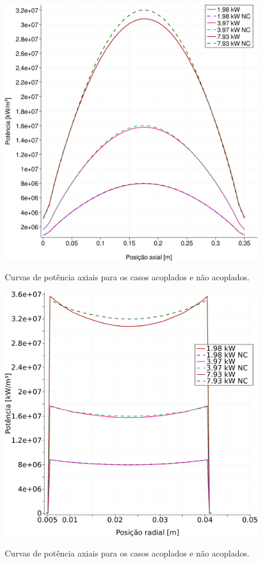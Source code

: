 \begin{figure}[htb]
  \caption{Curvas de potência axiais para os casos acoplados e não acoplados.}
  \centering\includegraphics[scale=0.5]{figuras/Q_all_z_square_port.png}
  \label{fig:Q_all_z}
\end{figure}

\begin{figure}[htb]
  \caption{Curvas de potência axiais para os casos acoplados e não acoplados.}
  \centering\includegraphics[scale=0.5]{figuras/Q_all_x_square_port.png}
  \label{fig:Q_all_x}
\end{figure}

